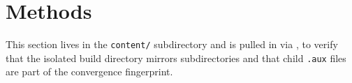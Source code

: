 \section{Methods}
This section lives in the \texttt{content/} subdirectory and is pulled in via
\verb||, to verify that the isolated build directory mirrors
\verb|| subdirectories and that child \texttt{.aux} files are part of
the convergence fingerprint.
